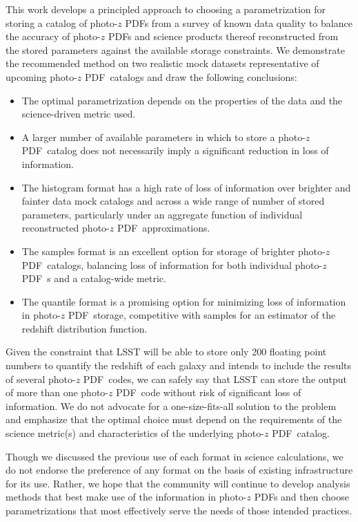 \documentclass[\docopts]{\docclass}
\newcommand{\pz}{photo-$z$ PDF}
\begin{document}
This work develops a principled approach to choosing a parametrization for 
storing a catalog of \pz s from a survey of known data quality to balance the 
accuracy of \pz s and science products thereof reconstructed from the stored 
parameters against the available storage constraints.
We demonstrate the recommended method on two realistic mock datasets 
representative of upcoming \pz\ catalogs and draw the following conclusions:
\begin{itemize}
  \item The optimal parametrization depends on the properties of the data and 
the science-driven metric used.
  \item A larger number of available parameters in which to store a \pz\ 
catalog does not necessarily imply a significant reduction in loss of 
information.
  \item The histogram format has a high rate of loss of information over 
brighter and fainter data mock catalogs and across a wide range of number of 
stored parameters, particularly under an aggregate function of individual 
reconstructed \pz\ approximations.
  \item The samples format is an excellent option for storage of brighter \pz\ 
catalogs, balancing loss of information for both individual \pz\ s and a 
catalog-wide metric.
  \item The quantile format is a promising option for minimizing loss of 
information in \pz\ storage, competitive with samples for an estimator of the 
redshift distribution function.
\end{itemize}

Given the constraint that LSST will be able to store only 200 floating point 
numbers to quantify the redshift of each galaxy and intends to include the 
results of several \pz\ codes, we can safely say that LSST can store the output 
of more than one \pz\ code without risk of significant loss of information.
We do not advocate for a one-size-fits-all solution to the problem and 
emphasize that the optimal choice must depend on the requirements of the 
science metric(s) and characteristics of the underlying \pz\ catalog.

Though we discussed the previous use of each format in science calculations, we 
do not endorse the preference of any format on the basis of existing 
infrastructure for its use.
Rather, we hope that the community will continue to develop analysis methods 
that best make use of the information in \pz s and then choose parametrizations 
that most effectively serve the needs of those intended practices.
\end{document}
